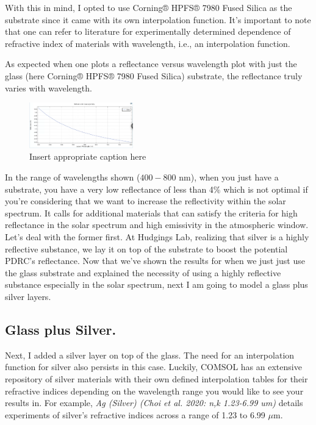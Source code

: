With this in mind, I opted to use Corning® HPFS® 7980 Fused Silica as the substrate since it came with its own interpolation function. It's important to note that one can refer to literature for experimentally determined dependence of refractive index of materials with wavelength, i.e., an interpolation function.

As expected when one plots a reflectance versus wavelength plot with just the glass (here Corning® HPFS® 7980 Fused Silica) substrate, the reflectance truly varies with wavelength.

\begin{figure}[ht!]
  \centering
  \includegraphics[width=0.4\textwidth]{Chapters/Figures/Chapter 4 Figures/Reflectance (Just Glass).png}
  \caption{Insert appropriate caption here}
  \label{fig:Insert appropriate label here}
\end{figure}

In the range of wavelengths shown ($400 - 800$ nm), when you just have a substrate, you have a very low reflectance of less than 4\% which is not optimal if you're considering that we want to increase the reflectivity within the solar spectrum. It calls for additional materials that can satisfy the criteria for high reflectance in the solar spectrum and high emissivity in the atmospheric window. Let's deal with the former first. At Hudgings Lab, realizing that silver is a highly reflective substance, we lay it on top of the substrate to boost the potential PDRC's reflectance. Now that we've shown the results for when we just just use the glass substrate and explained the necessity of using a highly reflective substance especially in the solar spectrum, next I am going to model a glass plus silver layers.

\subsection{Glass plus Silver.}
Next, I added a silver layer on top of the glass. The need for an interpolation function for silver also persists in this case. Luckily, COMSOL has an extensive repository of silver materials with their own defined interpolation tables for their refractive indices depending on the wavelength range you would like to see your results in. For example, \emph{Ag (Silver) (Choi et al. 2020: n,k 1.23-6.99 um)} details experiments of silver's refractive indices across a range of 1.23 to 6.99 $\mu$m.

